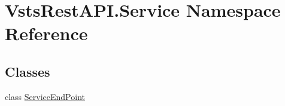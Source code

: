\hypertarget{namespace_vsts_rest_a_p_i_1_1_service}{}\section{Vsts\+Rest\+A\+P\+I.\+Service Namespace Reference}
\label{namespace_vsts_rest_a_p_i_1_1_service}
\subsection*{Classes}
\begin{DoxyCompactItemize}
\item 
class \mbox{\hyperlink{class_vsts_rest_a_p_i_1_1_service_1_1_service_end_point}{Service\+End\+Point}}
\end{DoxyCompactItemize}
